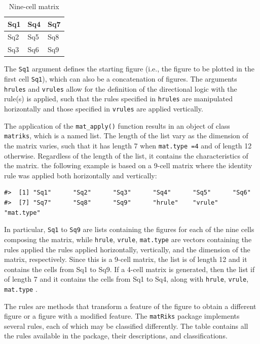 \begin{table}

\caption{\label{tab:nineCell-static}Nine-cell matrix}
\centering
\begin{tabular}[t]{l|l|l}
\hline
Sq1 & Sq4 & Sq7\\
\hline
Sq2 & Sq5 & Sq8\\
\hline
Sq3 & Sq6 & Sq9\\
\hline
\end{tabular}
\end{table}

The \texttt{Sq1} argument defines the starting figure (i.e., the figure to be plotted in the first cell \texttt{Sq1}), which can also be a concatenation of figures. The arguments \texttt{hrules} and \texttt{vrules} allow for the definition of the directional logic with the rule(s) is applied, such that the rules specified in \texttt{hrules} are manipulated horizontally and those specified in \texttt{vrules} are applied vertically.

The application of the \texttt{mat\_apply()} function results in an object of class \texttt{matriks}, which is a named list. The length of the list vary as the dimension of the matrix varies, such that it has length 7 when \texttt{mat.type\ =4} and of length 12 otherwise. Regardless of the length of the list, it contains the characteristics of the matrix. the following example is based on a 9-cell matrix where the identity rule was applied both horizontally and vertically:

\begin{verbatim}
#>  [1] "Sq1"      "Sq2"      "Sq3"      "Sq4"      "Sq5"      "Sq6"     
#>  [7] "Sq7"      "Sq8"      "Sq9"      "hrule"    "vrule"    "mat.type"
\end{verbatim}

In particular, \texttt{Sq1} to \texttt{Sq9} are lists containing the figures for each of the nine cells composing the matrix, while \texttt{hrule}, \texttt{vrule}, \texttt{mat.type} are vectors containing the rules applied the rules applied horizontally, vertically, and the dimension of the matrix, respectively. Since this is a 9-cell matrix, the list is of length 12 and it contains the cells from Sq1 to Sq9. If a 4-cell matrix is generated, then the list if of length 7 and it contains the cells from Sq1 to Sq4, along with \texttt{hrule}, \texttt{vrule}, \texttt{mat.type} .

The rules are methods that transform a feature of the figure to obtain a different figure or a figure with a modified feature.
The \texttt{matRiks} package implements several rules, each of which may be classified differently.
The table contains all the rules available in the package, their descriptions, and classifications.

